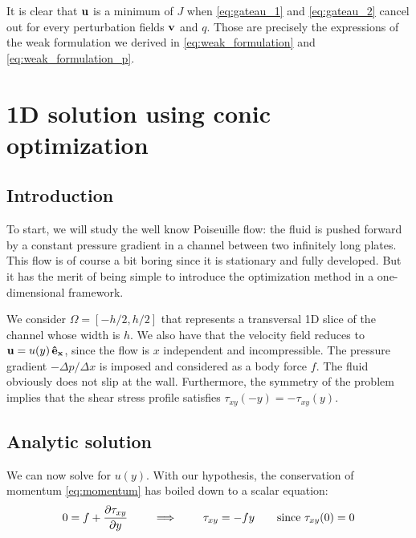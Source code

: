 \documentclass[11 pt]{report}
\begin{document}
It is clear that $\mathbf{u}$ is a minimum of $J$ when \eqref{eq:gateau_1} and \eqref{eq:gateau_2} cancel out for every perturbation fields $\mathbf{v}$ and $q$. Those are precisely the expressions of the weak formulation we derived in \eqref{eq:weak_formulation} and \eqref{eq:weak_formulation_p}.


\chapter{1D solution using conic optimization}
\label{chap:chap1}

\section{Introduction}
To start, we will study the well know Poiseuille flow: the fluid is pushed forward by a constant pressure gradient in a channel between two infinitely long plates. This flow is of course a bit boring since it is stationary and fully developed. But it has the merit of being simple to introduce the optimization method in a one-dimensional framework.

We consider $\Omega = [-h/2, h/2]$ that represents a transversal 1D slice of the channel whose width is $h$. We also have that the velocity field reduces to $\mathbf{u} = u(y)\,\mathbf{\hat{e}_x}$, since the flow is $x$ independent and incompressible. The pressure gradient $-\Delta p/\Delta x$ is imposed and considered as a body force $f$. The fluid obviously does not slip at the wall. Furthermore, the symmetry of the problem implies that the shear stress profile satisfies $\tau_{xy}(-y) = -\tau_{xy}(y)$.


\section{Analytic solution}
\label{sec:analytic1D}
We can now solve for $u(y)$. With our hypothesis, the conservation of momentum \eqref{eq:momentum} has boiled down to a scalar equation:
\begin{align}
    0 = f + \pdv{\tau_{xy}}{y} \qquad \implies \qquad \tau_{xy} = -f y \qquad \text{since } \tau_{xy}(0)=0
    \label{eq:tau_xy}
\end{align}
\end{document}
